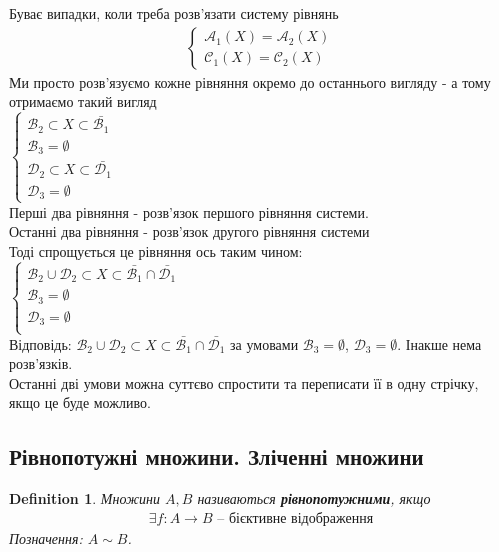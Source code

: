 \documentclass[a4paper, 14pt]{extarticle}
\theoremstyle{theoremdd}
\theoremstyle{theoremdd}
\newtheorem{definition}[theorem]{Definition}
\theoremstyle{theoremdd}
\theoremstyle{theoremdd}
\theoremstyle{theoremdd}
\theoremstyle{theoremdd}
\theoremstyle{theoremdd}
\theoremstyle{theoremdd}
\theoremstyle{theoremdd}
\theoremstyle{theoremdd}
\theoremstyle{theoremdd}
\theoremstyle{theoremdd}
\theoremstyle{theoremdd}
\theoremstyle{theoremdd}
\theoremstyle{theoremdd}
\begin{document}
Буває випадки, коли треба розв'язати систему рівнянь
\begin{align*}
\begin{cases}
\mathcal{A}_1(X) = \mathcal{A}_2(X) \\
\mathcal{C}_1(X) = \mathcal{C}_2(X)
\end{cases}
\end{align*}
Ми просто розв'язуємо кожне рівняння окремо до останнього вигляду - а тому отримаємо такий вигляд\\
$\begin{cases}
 \mathcal{B}_2 \subset X \subset \bar{\mathcal{B}_1} \\
 \mathcal{B}_3 = \emptyset \\
  \mathcal{D}_2 \subset X \subset \bar{\mathcal{D}_1} \\
 \mathcal{D}_3 = \emptyset
\end{cases}
$\\
Перші два рівняння - розв'язок першого рівняння системи. \\ Останні два рівняння - розв'язок другого рівняння системи\\
Тоді спрощується це рівняння ось таким чином: \\
$\begin{cases}
\mathcal{B}_2 \cup \mathcal{D}_2 \subset X \subset \bar{\mathcal{B}_1} \cap \bar{\mathcal{D}_1} \\
\mathcal{B}_3 = \emptyset \\
\mathcal{D}_3 = \emptyset \\
\end{cases}$\\
Відповідь: $\mathcal{B}_2 \cup \mathcal{D}_2 \subset X \subset \bar{\mathcal{B}_1} \cap \bar{\mathcal{D}_1}$ за умовами $\mathcal{B}_3 = \emptyset$,
$\mathcal{D}_3 = \emptyset$. Інакше нема розв'язків.\\
Останні дві умови можна суттєво спростити та переписати її в одну стрічку, якщо це буде можливо.

\subsection{Рівнопотужні множини. Зліченні множини}
\begin{definition}
Множини $A,B$ називаються \textbf{рівнопотужними}, якщо
\begin{align*}
\exists f \colon A \to B \text{ -- бієктивне відображення}
\end{align*}
Позначення: $A \sim B$.
\end{definition}
\end{document}
